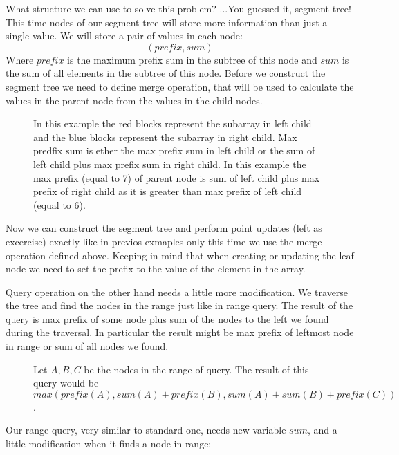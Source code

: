 \documentclass{article}
\begin{document}
What structure we can use to solve this problem? ...You guessed it, segment tree! 
This time nodes of our segment tree will store more information than just a single value. 
We will store a pair of values in each node:
\begin{equation}
    (prefix, sum)
\end{equation}
Where \(prefix\) is the maximum prefix sum in the subtree of this node and \(sum\) is the sum of all elements in the subtree of this node. Before we construct the segment tree we need to define merge operation, that will be used to calculate the values in the parent node from the values in the child nodes.


\begin{figure}[H]
    \centering
    
    \caption{In this example the red blocks represent the subarray in left child and the blue blocks represent the subarray in right child. 
    Max predfix sum is ether the max prefix sum in left child or the sum of left child plus max prefix sum in right child. In this example the max prefix (equal to 7) of parent node is sum of left child plus max prefix of right child as it is greater than max prefix of left child (equal to 6).}
\end{figure}

Now we can construct the segment tree and perform point updates (left as excercise) exactly like in previos exmaples only this time we use the merge operation defined above.
Keeping in mind that when creating or updating the leaf node we need to set the prefix to the value of the element in the array.

Query operation on the other hand needs a little more modification.
We traverse the tree and find the nodes in the range just like in range query.
The result of the query is max prefix of some node plus sum of the nodes to the left we found during the traversal.
In particular the result might be max prefix of leftmost node in range or sum of all nodes we found.
\begin{figure}[H]
    \centering
    
    \caption{Let $A,B,C$ be the nodes in the range of query. The result of this query would be $max(prefix(A), sum(A) + prefix(B), sum(A) + sum(B) + prefix(C))$.}
\end{figure}

Our range query, very similar to standard one, needs new variable $sum$, and a little modification 
when it finds a node in range:
\end{document}
